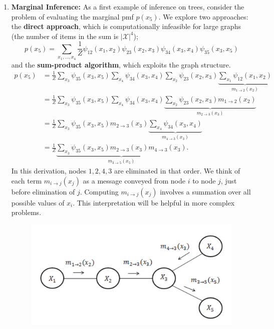 \documentclass[11pt,a4paper]{article}
\begin{document}
\begin{enumerate}
    \item \textbf{Marginal Inference:} As a first example of inference on trees, consider the problem of evaluating the marginal pmf $p(x_5)$. We explore two approaches: the \textbf{direct approach}, which is computationally infeasible for large graphs (the number of items in the sum is $|\mathcal{X}|^4$);
    $$p(x_5)=\sum_{x_1,...,x_4}\frac{1}{Z}\psi_{12}(x_1,x_2)\psi_{23}(x_2,x_3)\psi_{34}(x_3,x_4)\psi_{35}(x_3,x_5)$$
    and the \textbf{sum-product algorithm}, which exploits the graph structure.
    $$
    \begin{aligned}
    p\left(x_5\right) &=\frac{1}{Z} \sum_{x_3} \psi_{35}\left(x_3, x_5\right) \sum_{x_4} \psi_{34}\left(x_3, x_4\right) \sum_{x_2} \psi_{23}\left(x_2, x_3\right) \underbrace{\sum_{x_1} \psi_{12}\left(x_1, x_2\right)}_{m_{1 \rightarrow 2}\left(x_2\right)} \\
    &=\frac{1}{Z} \sum_{x_3} \psi_{35}\left(x_3, x_5\right) \sum_{x_4} \psi_{34}\left(x_3, x_4\right) \underbrace{\sum_{x_2} \psi_{23}\left(x_2, x_3\right) m_{1 \rightarrow 2}\left(x_2\right)}_{m_{2 \rightarrow 3}\left(x_3\right)} \\
    &=\frac{1}{Z} \sum_{x_3} \psi_{35}\left(x_3, x_5\right) m_{2 \rightarrow 3}\left(x_3\right) \underbrace{\sum_{x_4} \psi_{34}\left(x_3, x_4\right)}_{m_{4 \rightarrow 3}\left(x_3\right)} \\
    &=\frac{1}{Z} \underbrace{\sum_{x_3} \psi_{35}\left(x_3, x_5\right) m_{2 \rightarrow 3}\left(x_3\right) m_{4 \rightarrow 3}\left(x_3\right)}_{m_{3 \rightarrow 5}\left(x_5\right)} .
    \end{aligned}
    $$
    In this derivation, nodes $1,2,4,3$ are eliminated in that order. We think of each term $m_{i \rightarrow j}\left(x_j\right)$ as a message conveyed from node $i$ to node $j$, just before elimination of $j$. Computing $m_{i \rightarrow j}\left(x_j\right)$ involves a summation over all possible values of $x_i$. This interpretation will be helpful in more complex problems.
    \begin{center}\begin{figure}[htbp]
        \centering
        \includegraphics[scale=0.2]{belief.png}

\end{figure}
\end{center}
\end{enumerate}
\end{document}
